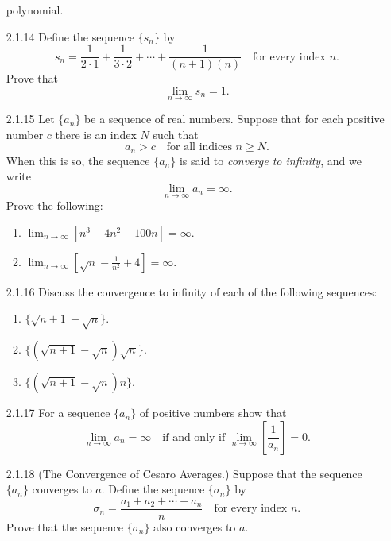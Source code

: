 \begin{enumerate}
                  polynomial.
   \item[2.1.14]  Define the sequence $\{s_n\}$ by
                  $$s_n = \frac{1}{2 \cdot 1} + \frac{1}{3 \cdot 2} + \cdots +
                    \frac{1}{(n + 1)(n)} \quad \text{for every index } n.$$
                  Prove that
                  $$\lim_{n \rightarrow \infty} s_n = 1.$$
   \item[2.1.15]  Let $\{a_n\}$ be a sequence of real numbers. Suppose that for
                  each positive number $c$ there is an index $N$ such that
                  $$a_n > c \quad\text{for all indices } n \ge N.$$
                  When this is so, the sequence $\{a_n\}$ is said to
                  \textit{converge to infinity}, and we write
                  $$\lim_{n \rightarrow \infty} a_n = \infty.$$
                  Prove the following:
                  \begin{enumerate}
                     \item $\displaystyle\lim_{n \rightarrow \infty}
                           [n^3 - 4n^2 - 100n] = \infty$.
                     \item $\displaystyle\lim_{n \rightarrow \infty}
                           \left[\sqrt{n} - \frac{1}{n^2} + 4\right] = \infty$.
                  \end{enumerate}
   \item[2.1.16]  Discuss the convergence to infinity of each of the following
                  sequences:
                  \begin{enumerate}
                     \item $\{\sqrt{n + 1} - \sqrt{n}\}$.
                     \item $\{(\sqrt{n + 1} - \sqrt{n})\sqrt{n}\}$.
                     \item $\{(\sqrt{n + 1} - \sqrt{n})n\}$.
                  \end{enumerate}
   \item[2.1.17]  For a sequence $\{a_n\}$ of positive numbers show that
                  $$\lim_{n \rightarrow \infty} a_n = \infty \quad\text{if and
                    only if } \lim_{n \rightarrow \infty}
                    \left[\frac{1}{a_n}\right] = 0.$$
   \item[2.1.18]  (The Convergence of Cesaro Averages.) Suppose that the
                  sequence $\{a_n\}$ converges to $a$. Define the sequence
                  $\{\sigma_n\}$ by
                  $$\sigma_n = \frac{a_1 + a_2 + \cdots + a_n}{n}
                    \quad\text{for every index } n.$$
                  Prove that the sequence $\{\sigma_n\}$ also converges to $a$.
\end{enumerate}
